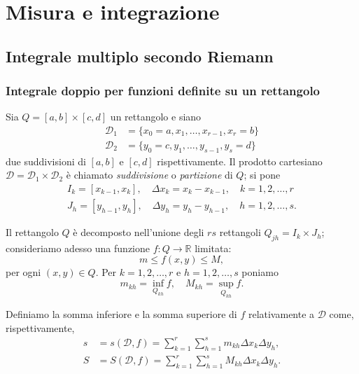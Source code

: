 \documentclass[a4paper]{book}
\numberwithin{equation}{section}
\theoremstyle{plain}
\theoremstyle{definition}
\theoremstyle{remark}
\theoremstyle{example}
\begin{document}
		\chapter{Misura e integrazione}
		\section{Integrale multiplo secondo Riemann}
		\subsection{Integrale doppio per funzioni definite su un rettangolo}
		Sia $Q = [a, b] \times [c, d]$ un rettangolo e siano
		\begin{align*}
			\mathcal{D}_1 &= \{ x_0 = a, x_1, \dots, x_{r-1}, x_r = b\} \\
			\mathcal{D}_2 &= \{ y_0 = c, y_1, \dots, y_{s-1}, y_s = d \}
		\end{align*}
		due suddivisioni di $[a, b]$ e $[c, d]$ rispettivamente. Il prodotto cartesiano $\mathcal{D} = \mathcal{D}_1 \times \mathcal{D}_2$ è chiamato \emph{suddivisione} o \emph{partizione} di $Q$; si pone
		\begin{align*}
			I_k = [x_{k-1}, x_k], \quad \Delta x_k = x_k - x_{k-1}, \quad k = 1, 2, \dots, r \\
			J_h = [y_{h-1}, y_h], \quad \Delta y_h = y_h - y_{h-1}, \quad h = 1, 2, \dots, s.
		\end{align*}

		Il rettangolo $Q$ è decomposto nell'unione degli $rs$ rettangoli $Q_{jh} = I_k \times J_h$; consideriamo adesso una funzione $f \colon Q \to \mathbb{R}$ limitata:
		\begin{equation}
			\label{eqn:flimitata}
			m \le f(x, y) \le M,
		\end{equation}
		per ogni $(x, y) \in Q$.
		Per $k = 1, 2, \dots, r$ e $h = 1, 2, \dots, s$ poniamo
		\begin{equation}
			m_{kh} = \inf_{Q_{kh}}f, \quad M_{kh} = \sup_{Q_{kh}} f.
		\end{equation}

		Definiamo la somma inferiore e la somma superiore di $f$ relativamente a $\mathcal{D}$ come, rispettivamente,
		\begin{align*}
			s &= s(\mathcal{D}, f) = \sum_{k=1}^r\sum_{h=1}^s m_{kh}\Delta x_k \Delta y_h, \\
			S &= S(\mathcal{D}, f) = \sum_{k=1}^r \sum_{h=1}^s M_{kh} \Delta x_k \Delta y_h.
		\end{align*}
\end{document}
